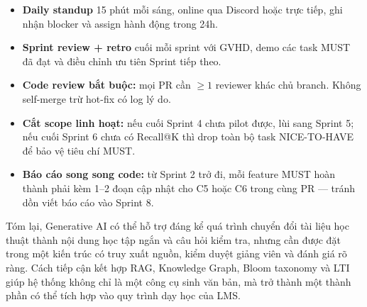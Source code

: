 \begin{itemize}
    \item \textbf{Daily standup} 15 phút mỗi sáng, online qua Discord
          hoặc trực tiếp, ghi nhận blocker và assign hành động trong
          24h.
    \item \textbf{Sprint review + retro} cuối mỗi sprint với GVHD, demo
          các task MUST đã đạt và điều chỉnh ưu tiên Sprint tiếp theo.
    \item \textbf{Code review bắt buộc:} mọi PR cần $\geq 1$ reviewer
          khác chủ branch. Không self-merge trừ hot-fix có log lý do.
    \item \textbf{Cắt scope linh hoạt:} nếu cuối Sprint 4 chưa pilot
          được, lùi sang Sprint 5; nếu cuối Sprint 6 chưa có Recall@K
          thì drop toàn bộ task NICE-TO-HAVE để bảo vệ tiêu chí MUST.
    \item \textbf{Báo cáo song song code:} từ Sprint 2 trở đi, mỗi
          feature MUST hoàn thành phải kèm 1--2 đoạn cập nhật cho C5
          hoặc C6 trong cùng PR --- tránh dồn viết báo cáo vào Sprint 8.
\end{itemize}

Tóm lại, Generative AI có thể hỗ trợ đáng kể quá trình chuyển đổi tài liệu học
thuật thành nội dung học tập ngắn và câu hỏi kiểm tra, nhưng cần được đặt
trong một kiến trúc có truy xuất nguồn, kiểm duyệt giảng viên và đánh giá rõ
ràng. Cách tiếp cận kết hợp RAG, Knowledge Graph, Bloom taxonomy và LTI giúp
hệ thống không chỉ là một công cụ sinh văn bản, mà trở thành một thành phần có
thể tích hợp vào quy trình dạy học của LMS.
